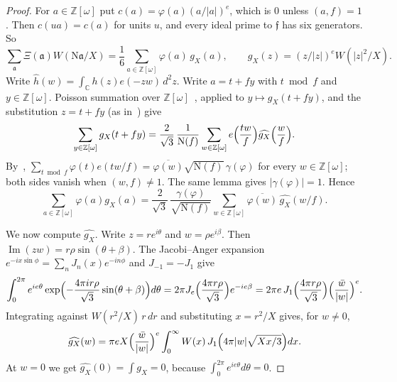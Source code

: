 \documentclass[11pt]{article}
\numberwithin{equation}{section}
\newcommand{\OO}{\mathbb Z[\omega]}
\newcommand{\N}{\mathrm N}
\begin{document}
\begin{proof}
For $a\in\OO$ put $c(a)=\varphi(a)(a/|a|)^e$, which is $0$ unless $(a,f)=1$. Then $c(ua)=c(a)$ for units
$u$, and every ideal prime to $\mathfrak f$ has six generators. So
\begin{equation}\label{eq:d176}
 \sum_{\mathfrak a}\Xi(\mathfrak a)W(\N\mathfrak a/X)=\frac16\sum_{a\in\OO}\varphi(a)\,g_X(a),\qquad
 g_X(z)=(z/|z|)^eW(|z|^2/X).
\end{equation}
Write $\widehat h(w)=\int_{\mathbb C}h(z)e(-zw)\,d^2z$. Write $a=t+fy$ with $t\bmod f$ and $y\in\OO$. Poisson
summation over $\OO$~\cite[Theorem~19]{QF}, applied to $y\mapsto g_X(t+fy)$, and the substitution
$z=t+fy$ (as in~\cite[(4.20)]{QF}) give
\begin{equation}\label{eq:d177}
 \sum_{y\in\OO}g_X(t+fy)=\frac2{\sqrt3}\,\frac1{\N(f)}\sum_{w\in\OO}e\Bigl(\frac{tw}f\Bigr)\widehat{g_X}\Bigl(\frac wf\Bigr).
\end{equation}
By~\cite[Lemma~17]{QF}, $\sum_{t\bmod f}\varphi(t)e(tw/f)=\overline{\varphi(w)}\sqrt{\N(f)}\,\gamma(\varphi)$ for
every $w\in\OO$; both sides vanish when $(w,f)\ne1$. The same lemma gives $|\gamma(\varphi)|=1$. Hence
\begin{equation}\label{eq:s5-step1}
 \sum_{a\in\OO}\varphi(a)g_X(a)=\frac2{\sqrt3}\,\frac{\gamma(\varphi)}{\sqrt{\N(f)}}
 \sum_{w\in\OO}\overline{\varphi(w)}\,\widehat{g_X}(w/f).
\end{equation}

We now compute $\widehat{g_X}$. Write $z=re^{i\theta}$ and $w=\rho e^{i\beta}$. Then
$\operatorname{Im}(zw)=r\rho\sin(\theta+\beta)$. The Jacobi--Anger expansion~\cite[(10.12.1)]{DLMF}
$e^{-ix\sin\phi}=\sum_nJ_n(x)e^{-in\phi}$ and $J_{-1}=-J_1$ give
\begin{equation}\label{eq:d178}
 \int_0^{2\pi}e^{ie\theta}\exp\Bigl(-\frac{4\pi i r\rho}{\sqrt3}\sin(\theta+\beta)\Bigr)d\theta
 =2\pi J_e\Bigl(\frac{4\pi r\rho}{\sqrt3}\Bigr)e^{-ie\beta}
 =2\pi e\,J_1\Bigl(\frac{4\pi r\rho}{\sqrt3}\Bigr)\Bigl(\frac{\bar w}{|w|}\Bigr)^e .
\end{equation}
Integrating against $W(r^2/X)\,r\,dr$ and substituting $x=r^2/X$ gives, for $w\ne0$,
\begin{equation}\label{eq:s5-hankel}
 \widehat{g_X}(w)=\pi eX\Bigl(\frac{\bar w}{|w|}\Bigr)^e\int_0^\infty W(x)\,
 J_1\Bigl(4\pi|w|\sqrt{Xx/3}\Bigr)dx .
\end{equation}
At $w=0$ we get $\widehat{g_X}(0)=\int g_X=0$, because $\int_0^{2\pi}e^{ie\theta}d\theta=0$.


\end{proof}
\end{document}
